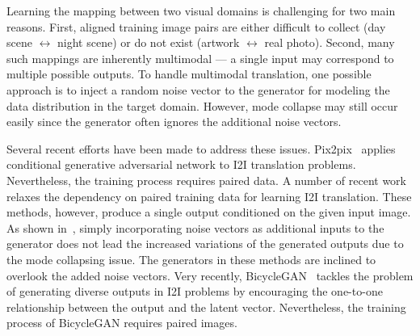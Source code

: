 \documentclass[runningheads]{llncs}
\renewcommand{\jiabin}[1]{}
\begin{document}
Learning the mapping between two visual domains is challenging for two main reasons. 
%
First, aligned training image pairs are either difficult to collect (\eg day scene $\leftrightarrow$ night scene) or do not exist (\eg artwork $\leftrightarrow$ real photo).
%
Second, many such mappings are inherently multimodal --- a single input may correspond to multiple possible outputs.
% 
To handle multimodal translation, one possible approach is to inject a random noise vector to the generator for modeling the data distribution in the target domain. 
%
However, mode collapse may still occur easily since the generator often ignores the additional noise vectors.

Several recent efforts have been made to address these issues.
%
{Pix2pix}~\cite{isola2017pix2pix} applies conditional generative adversarial network to I2I translation problems.
%
Nevertheless, the training process requires paired data.
%
A number of recent work~\cite{zhu2017cyclegan,liu2017unit,yi2017dualgan,taigman2016unsupervised,choi2017stargan} relaxes the dependency on paired training data for learning I2I translation. 
%
%
These methods, however, produce a single output conditioned on the given input image.
%
As shown in~\cite{isola2017pix2pix,zhu2017bicyclegan}, simply incorporating noise vectors as additional inputs to the generator does not lead the increased variations of the generated outputs due to the mode collapsing issue.
%
The generators in these methods are inclined to overlook the added noise vectors.
%
Very recently, {BicycleGAN}~\cite{zhu2017bicyclegan} tackles the problem of generating diverse outputs in I2I problems by encouraging the one-to-one relationship between the output and the latent vector.
%
%
Nevertheless, the training process of {BicycleGAN} requires paired images.
\end{document}

